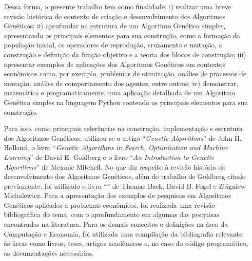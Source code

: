 
Dessa forma, o presente trabalho tem como finalidade: i) realizar uma breve revisão histórica do contexto de criação e desenvolvimento dos Algoritmos Genéticos; ii) aprofundar na estrutura de um Algoritmo Genético simples, apresentando os principais elementos para sua construção, como a formação da população inicial, os operadores de reprodução, cruzamento e mutação, a construção e definição da função objetivo e a teoria dos blocos de construção; iii) apresentar exemplos de aplicações dos Algoritmos Genéticos em contextos econômicos como, por exemplo, problemas de otimização, análise de processos de inovação, análise de comportamento dos agentes, entre outros; iv) demonstrar, matemática e programaticamente, uma aplicação detalhada de um Algoritmo Genético simples na linguagem Python contendo os principais elementos para sua construção.

Para isso, como principais referências na construção, implementação e estrutura dos Algoritmos Genéticos, utilizou-se o artigo \enquote{\textit{Genetic Algorithms}} de John H. Holland, o livro \enquote{\textit{Genetic Algorithms in Search, Optimization and Machine Learning}} de David E. Goldberg e o livro \enquote{\textit{An Introduction to Genetic Algorithms}} de Melanie Mitchell. No que diz respeito à revisão história do desenvolvimento dos Algoritmos Genéticos, além do trabalho de Goldberg citado previamente, foi utilizado o livro \enquote{} de Thomas Back, David B. Fogel e Zbigniew Michalewicz. Para a apresentação dos exemplos de pesquisas em Algoritmos Genéticos aplicados a problemas econômicos, foi realizada uma revisão bibliográfica  do tema, com o aprofundamento em algumas das pesquisas encontradas na literatura. Para os demais conceitos e definições na área da Computação e Economia, foi utilizada uma compilação da bibliografia relevante às áreas como livros, teses, artigos acadêmicos e, no caso do código programático, as documentações necessárias.

